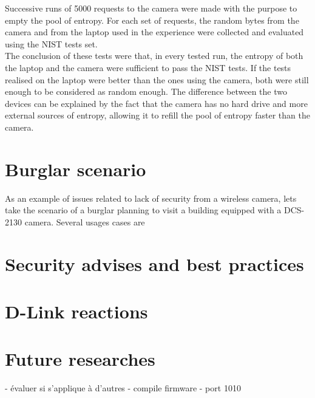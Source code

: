 Successive runs of 5000 requests to the camera were made with the purpose to empty the pool of entropy.
For each set of requests, the random bytes from the camera and from the laptop used in the experience were collected and evaluated using the NIST tests set.\\

The conclusion of these tests were that, in every tested run, the entropy of both the laptop and the camera were sufficient to pass the NIST tests.
If the tests realised on the laptop were better than the ones using the camera, both were still enough to be considered as random enough.
The difference between the two devices can be explained by the fact that the camera has no hard drive and more external sources of entropy, allowing it to refill the pool of entropy faster than the camera.

\section{Burglar scenario}
\label{sec:dcs-burglar}

As an example of issues related to lack of security from a wireless camera, lets take the scenario of a burglar planning to visit a building equipped with a DCS-2130 camera.
Several usages cases are 

\section{Security advises and best practices}
\label{sec:dcs-security}

\section{D-Link reactions}
\label{sec:dcs-dlink}

\section{Future researches}
\label{sec:dcs-future}

- évaluer si s'applique à d'autres
- compile firmware
- port 1010
